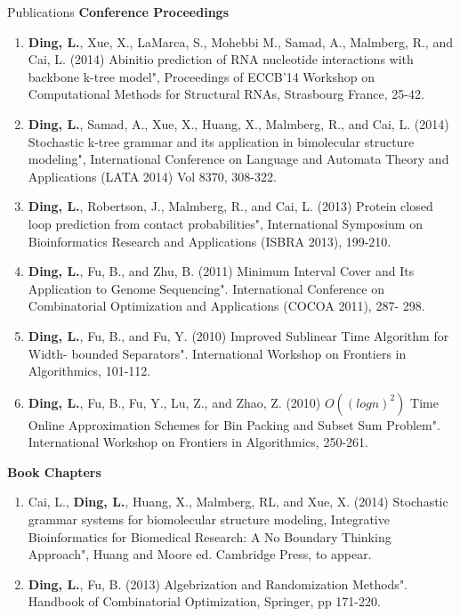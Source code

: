 \documentclass{resume} %
\begin{document}
\begin{rSection}{Publications}
\textbf{Conference Proceedings}
\begin{enumerate}
\item \textbf{Ding, L.}, Xue, X., LaMarca, S., Mohebbi M., Samad, A., Malmberg, R., and Cai, L. (2014) Abinitio prediction of RNA nucleotide interactions with backbone k-tree model", Proceedings of ECCB'14 Workshop on Computational Methods for Structural RNAs, Strasbourg France, 25-42.

\item \textbf{Ding, L.}, Samad, A., Xue, X., Huang, X., Malmberg, R., and Cai, L. (2014) Stochastic k-tree grammar and its application in bimolecular structure modeling", International Conference on Language and Automata Theory and Applications (LATA 2014) Vol 8370, 308-322.

\item \textbf{Ding, L.}, Robertson, J., Malmberg, R., and Cai, L. (2013) Protein closed loop prediction from contact probabilities", International Symposium on Bioinformatics Research and Applications (ISBRA 2013), 199-210.

\item \textbf{Ding, L.}, Fu, B., and Zhu, B. (2011) Minimum Interval Cover and Its Application to Genome Sequencing". International Conference on Combinatorial Optimization and Applications (COCOA 2011), 287- 298.

\item \textbf{Ding, L.}, Fu, B., and Fu, Y. (2010) Improved Sublinear Time Algorithm for Width- bounded Separators". International Workshop on Frontiers in Algorithmics, 101-112.

\item \textbf{Ding, L.}, Fu, B., Fu, Y., Lu, Z., and Zhao, Z. (2010) $O((log n)^2)$ Time Online Approximation Schemes for Bin Packing and Subset Sum Problem". International Workshop on Frontiers in Algorithmics, 250-261.
\end{enumerate}


\textbf{Book Chapters}
\begin{enumerate}
\item Cai, L., \textbf{Ding, L.}, Huang, X., Malmberg, RL, and Xue, X. (2014) Stochastic grammar systems for biomolecular structure modeling, Integrative Bioinformatics for Biomedical Research: A No Boundary Thinking Approach", Huang and Moore ed. Cambridge Press, to appear.

\item \textbf{Ding, L.}, Fu, B. (2013) Algebrization and Randomization Methods". Handbook of Combinatorial Optimization, Springer, pp 171-220.


\end{enumerate}
\end{rSection}
\end{document}
